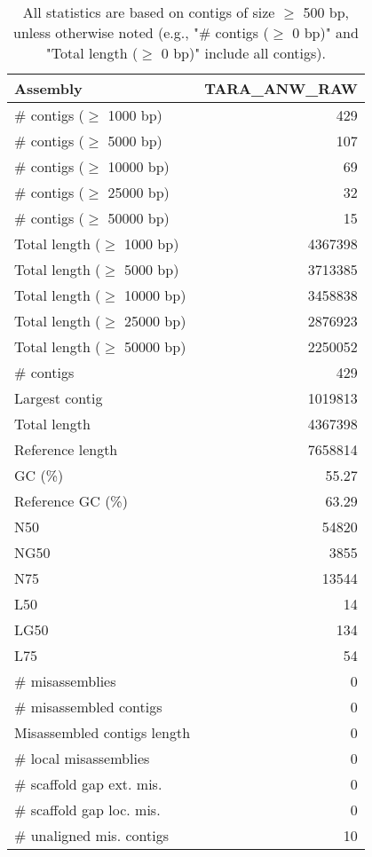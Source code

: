 \documentclass[12pt,a4paper]{article}
\begin{document}
\begin{table}[ht]
\begin{center}
\caption{All statistics are based on contigs of size $\geq$ 500 bp, unless otherwise noted (e.g., "\# contigs ($\geq$ 0 bp)" and "Total length ($\geq$ 0 bp)" include all contigs).}
\begin{tabular}{|l*{1}{|r}|}
\hline
Assembly & TARA\_ANW\_RAW \\ \hline
\# contigs ($\geq$ 1000 bp) & 429 \\ \hline
\# contigs ($\geq$ 5000 bp) & 107 \\ \hline
\# contigs ($\geq$ 10000 bp) & 69 \\ \hline
\# contigs ($\geq$ 25000 bp) & 32 \\ \hline
\# contigs ($\geq$ 50000 bp) & 15 \\ \hline
Total length ($\geq$ 1000 bp) & 4367398 \\ \hline
Total length ($\geq$ 5000 bp) & 3713385 \\ \hline
Total length ($\geq$ 10000 bp) & 3458838 \\ \hline
Total length ($\geq$ 25000 bp) & 2876923 \\ \hline
Total length ($\geq$ 50000 bp) & 2250052 \\ \hline
\# contigs & 429 \\ \hline
Largest contig & 1019813 \\ \hline
Total length & 4367398 \\ \hline
Reference length & 7658814 \\ \hline
GC (\%) & 55.27 \\ \hline
Reference GC (\%) & 63.29 \\ \hline
N50 & 54820 \\ \hline
NG50 & 3855 \\ \hline
N75 & 13544 \\ \hline
L50 & 14 \\ \hline
LG50 & 134 \\ \hline
L75 & 54 \\ \hline
\# misassemblies & 0 \\ \hline
\# misassembled contigs & 0 \\ \hline
Misassembled contigs length & 0 \\ \hline
\# local misassemblies & 0 \\ \hline
\# scaffold gap ext. mis. & 0 \\ \hline
\# scaffold gap loc. mis. & 0 \\ \hline
\# unaligned mis. contigs & 10 \\ \hline

\end{tabular}
\end{center}
\end{table}
\end{document}
